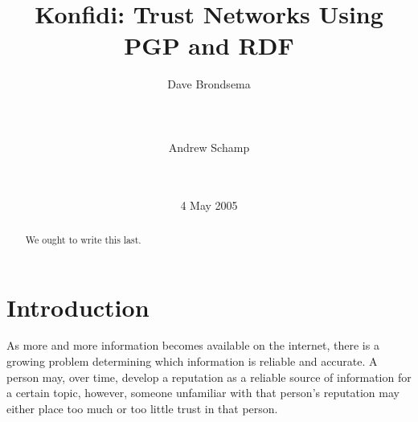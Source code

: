 \documentclass[onecolumn]{acm_proc_article-sp}
\begin{document}
%



\title{Konfidi: Trust Networks Using PGP and RDF}


\author{
\alignauthor Dave Brondsema\\
       \\
       \\
       \\
\alignauthor Andrew Schamp
       \\
       \\
       \\
}

\date{4 May 2005}

\maketitle
\begin{abstract}
We ought to write this last.
\end{abstract}





\section{Introduction}
As more and more information becomes available on the internet, there is a growing problem determining which information is reliable and accurate.  A person may, over time, develop a reputation as a reliable source of information for a certain topic, however, someone unfamiliar with that person's reputation may either place too much or too little trust in that person.  
\end{document}
